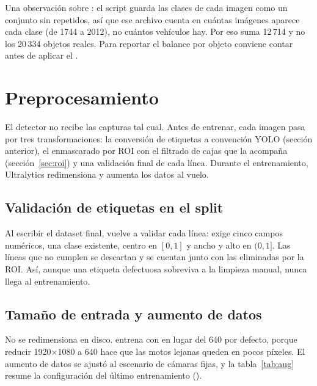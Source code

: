 \documentclass[11pt,a4paper]{article}
\begin{document}
Una observación sobre : el script guarda las clases de cada imagen como un conjunto sin repetidos, así que ese archivo cuenta en cuántas imágenes aparece cada clase (de 1744 a 2012), no cuántos vehículos hay. Por eso suma 12\,714 y no los 20\,334 objetos reales. Para reportar el balance por objeto conviene contar  antes de aplicar el .

\section{Preprocesamiento}

El detector no recibe las capturas tal cual. Antes de entrenar, cada imagen pasa por tres transformaciones: la conversión de etiquetas a convención YOLO (sección anterior), el enmascarado por ROI con el filtrado de cajas que la acompaña (sección~\ref{sec:roi}) y una validación final de cada línea. Durante el entrenamiento, Ultralytics redimensiona y aumenta los datos al vuelo.

\subsection{Validación de etiquetas en el split}

Al escribir el dataset final,  vuelve a validar cada línea: exige cinco campos numéricos, una clase existente, centro en $[0, 1]$ y ancho y alto en $(0, 1]$. Las líneas que no cumplen se descartan y se cuentan junto con las eliminadas por la ROI. Así, aunque una etiqueta defectuosa sobreviva a la limpieza manual, nunca llega al entrenamiento.

\subsection{Tamaño de entrada y aumento de datos}

No se redimensiona en disco.  entrena con  en lugar del 640 por defecto, porque reducir 1920$\times$1080 a 640 hace que las motos lejanas queden en pocos píxeles. El aumento de datos se ajustó al escenario de cámaras fijas, y la tabla~\ref{tab:aug} resume la configuración del último entrenamiento ().
\end{document}
